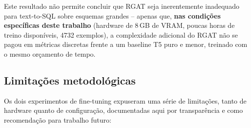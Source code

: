 Este resultado não permite concluir que RGAT seja inerentemente inadequado
para text-to-SQL sobre esquemas grandes -- apenas que, \textbf{nas
condições específicas deste trabalho} (hardware de 8\,GB de VRAM, poucas
horas de treino disponíveis, 4732 exemplos), a complexidade adicional do
RGAT não se pagou em métricas discretas frente a um baseline T5 puro e
menor, treinado com o mesmo orçamento de tempo.

\subsection{Limitações metodológicas}
\label{sec:limitations}

Os dois experimentos de fine-tuning expuseram uma série de limitações,
tanto de hardware quanto de configuração, documentadas aqui por
transparência e como recomendação para trabalho futuro:

